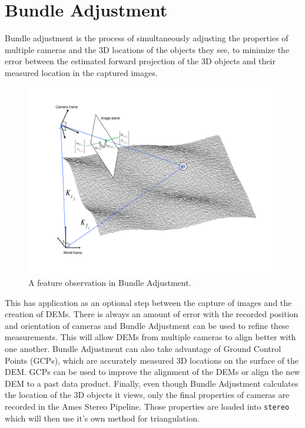 \chapter{Bundle Adjustment}

Bundle adjustment is the process of simultaneously adjusting the
properties of multiple cameras and the 3D locations of the objects
they see, to minimize the error between the estimated forward
projection of the 3D objects and their measured location in the captured
images. 

\begin{figure}[htp]
  \begin{center}
  \includegraphics[trim=20mm 20mm 20mm 15mm,clip,width=6in]{images/ba_feature_observation.pdf}
  \end{center}
  \caption{ A feature observation in Bundle Adjustment. \cite{moore09} }
  \label{fig:ba_feature}
\end{figure}

This has application as an optional step between the capture
of images and the creation of DEMs. There is always an amount of error
with the recorded position and orientation of cameras and Bundle
Adjustment can be used to refine these measurements. This will allow
DEMs from multiple cameras to align better with one another. Bundle
Adjustment can also take advantage of Ground Control Points (GCPs),
which are accurately measured 3D locations on the surface of the DEM. GCPs
can be used to improve the alignment of the DEMs or align the new DEM
to a past data product. Finally, even though Bundle Adjustment
calculates the location of the 3D objects it views, only the final
properties of cameras are recorded in the Ames Stereo Pipeline. Those
properties are loaded into \texttt{stereo} which will then use it's own
method for triangulation.


